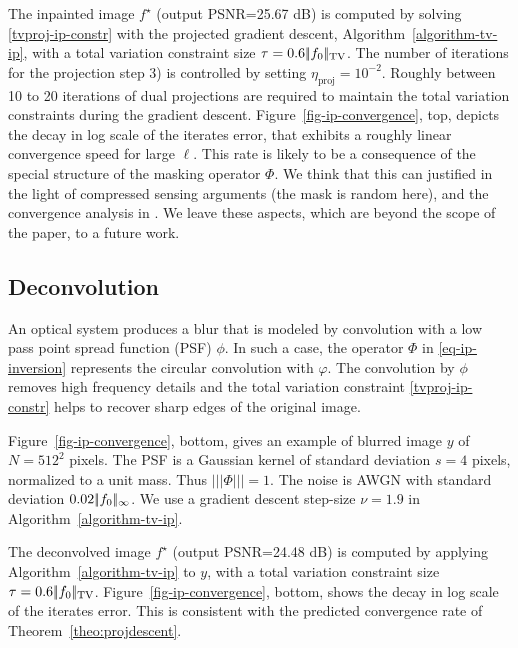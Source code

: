 \documentclass[11pt,nofonttune,a4paper]{IEEEtran}
\newcommand{\tol}{\eta}
\newcommand{\opnorm}[1]{\big|\!\big|\!\big|#1\big|\!\big|\!\big|}
\begin{document}
The inpainted image $f^\star$ (output PSNR=25.67 dB) is computed by solving \eqref{tvproj-ip-constr} with the projected gradient descent, Algorithm~\ref{algorithm-tv-ip}, with a total variation constraint size $\tau = 0.6 |\!| f_0 |\!|_{\text{TV}}$. The number of iterations for the projection step 3) is controlled by setting $\tol_{\text{proj}}=10^{-2}$. Roughly between 10 to 20 iterations of dual projections are required to maintain the total variation constraints during the gradient descent. Figure~\ref{fig-ip-convergence}, top, depicts the decay in log scale of the iterates error, that exhibits a roughly linear convergence speed for large $\ell$. This rate is likely to be a consequence of the special structure of the masking operator $\Phi$. We think that this can justified in the light of compressed sensing arguments (the mask is random here), and the convergence analysis in \cite{BrediesLorentz08}. We leave these aspects, which are beyond the scope of the paper, to a future work.


\subsection{Deconvolution}
\label{subsec-deconvolution}

An optical system produces a blur that is modeled by convolution with a low pass point spread function (PSF) $\phi$. In such a case, the operator $\Phi$ in \eqref{eq-ip-inversion} represents the circular convolution with $\varphi$. The convolution by $\phi$ removes high frequency details and the total variation constraint \eqref{tvproj-ip-constr} helps to recover sharp edges of the original image. 

Figure~\ref{fig-ip-convergence}, bottom, gives an example of blurred image $y$ of $N = 512^2$ pixels. The PSF is a Gaussian kernel 
of standard deviation $s=4$ pixels, normalized to a unit mass. Thus $\opnorm{\Phi}=1$. The noise is AWGN with standard deviation $0.02|\!| f_0 |\!|_{\infty}$. We use a gradient descent step-size $\nu=1.9$ in Algorithm~\ref{algorithm-tv-ip}.

The deconvolved image $f^\star$ (output PSNR=24.48 dB) is computed by applying Algorithm~\ref{algorithm-tv-ip} to $y$, with a total variation constraint size $\tau = 0.6 |\!| f_0 |\!|_{\text{TV}}$. Figure~\ref{fig-ip-convergence}, bottom, shows the decay in log scale of the iterates error. This is consistent with the predicted convergence rate of Theorem~\ref{theo:projdescent}.
\end{document}
